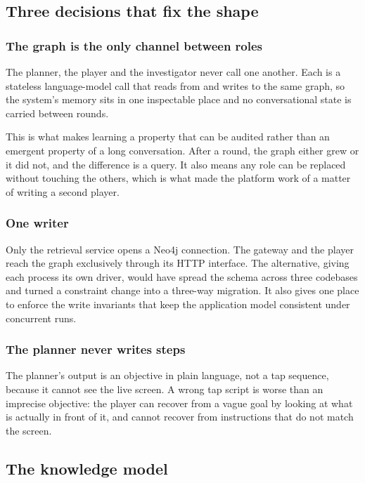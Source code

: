 \subsection{Three decisions that fix the shape}

\subsubsection{The graph is the only channel between roles}

The planner, the player and the investigator never call one another. Each is a
stateless language-model call that reads from and writes to the same graph, so
the system's memory sits in one inspectable place and no conversational state
is carried between rounds.

This is what makes learning a property that can be audited rather than an
emergent property of a long conversation. After a round, the graph either grew
or it did not, and the difference is a query. It also means any role can be
replaced without touching the others, which is what made the platform work of
 a matter of writing a second player.

\subsubsection{One writer}

Only the retrieval service opens a Neo4j connection. The gateway and the player
reach the graph exclusively through its HTTP interface. The alternative, giving
each process its own driver, would have spread the schema across three
codebases and turned a constraint change into a three-way migration. It also
gives one place to enforce the write invariants that keep the application model
consistent under concurrent runs.

\subsubsection{The planner never writes steps}

The planner's output is an objective in plain language, not a tap sequence,
because it cannot see the live screen. A wrong tap script is worse than an
imprecise objective: the player can recover from a vague goal by looking at
what is actually in front of it, and cannot recover from instructions that do
not match the screen.

\subsection{The knowledge model}

